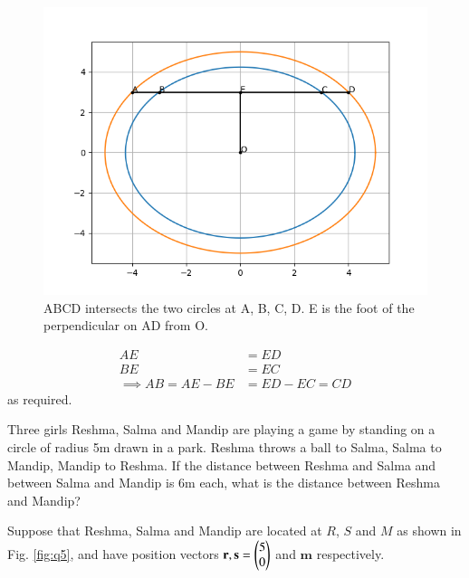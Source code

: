 \documentclass[journal,12pt,twocolumn]{IEEEtran}
\let\vec\mathbf
\begin{document}
\begin{figure}[!ht]
    \centering
    \includegraphics[width=\columnwidth]{figs/10_4_4.png}
    \caption{ABCD intersects the two circles at A, B, C, D. E is the foot of 
    the perpendicular on AD from O.}
    \label{fig:q4}
\end{figure}

\begin{align}
    AE &= ED \\
    BE &= EC \\
    \implies AB = AE - BE &= ED - EC = CD
    \label{eq:q4-1}
\end{align}
as required.

\problem Three girls Reshma, Salma and Mandip are playing a game by standing on 
a circle of radius 5m drawn in a park. Reshma throws a ball to Salma, Salma to 
Mandip, Mandip to Reshma. If the distance between Reshma and Salma and between 
Salma and Mandip is 6m each, what is the distance between Reshma and Mandip?

\solution Suppose that Reshma, Salma and Mandip are located at $R$, $S$ and $M$
as shown in Fig. \eqref{fig:q5}, and have position vectors $\vec{r}, \vec{s} = 
\myvec{5\\0}$ and $\vec{m}$ respectively.
\end{document}
